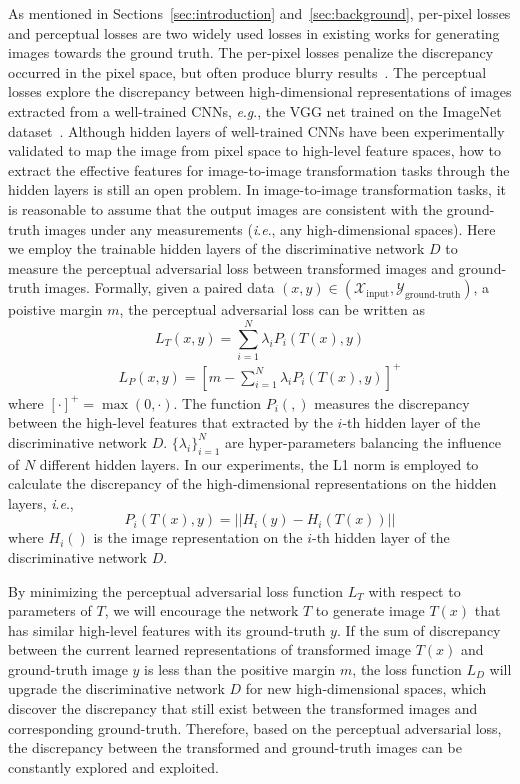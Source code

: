 \documentclass{article}
\newcommand{\ie}{\textit{i}.\textit{e}.}
\newcommand{\eg}{\textit{e}.\textit{g}.}
\begin{document}
As mentioned in Sections~\ref{sec:introduction} and~\ref{sec:background}, per-pixel losses and perceptual losses are two widely used losses in existing works for generating images towards the ground truth. The per-pixel losses penalize the discrepancy occurred in the pixel space, but often produce blurry results~\cite{pathak2016context, zhang2016colorful}. The perceptual losses explore the discrepancy between high-dimensional representations of images extracted from a well-trained CNNs, \eg, the VGG net trained on the ImageNet dataset~\cite{simonyan2014very}. Although hidden layers of well-trained CNNs have been experimentally validated to map the image from pixel space to high-level feature spaces, how to extract the effective features for image-to-image transformation tasks through the hidden layers is still an open problem. 
In image-to-image transformation tasks, it is reasonable to assume that the output images are consistent with the ground-truth images under any measurements (\ie, any high-dimensional spaces). Here we employ the trainable hidden layers of the discriminative network $D$ to measure the perceptual adversarial loss between transformed images and ground-truth images. Formally, given a paired data $(x,y) \in (\mathcal{X}_\text{input}, \mathcal{Y}_\text{ground-truth})$, a poistive margin $m$, the perceptual adversarial loss can be written as
\begin{equation}
L_T(x,y) = \sum_{i=1}^N \lambda_i P_i(T(x),y)
\end{equation}
\begin{equation}
\begin{aligned} 
L_P(x,y) = [m - \sum_{i=1}^N \lambda_i P_i(T(x),y)]^+
\end{aligned} 
\end{equation} 
where $[\cdot]^+=\max(0,\cdot)$. The function $P_i(,)$ measures the discrepancy between the high-level features that extracted by the $i$-th hidden layer of the discriminative network $D$. $\{\lambda_i\}_{i=1}^N$ are hyper-parameters balancing the influence of $N$ different hidden layers. In our experiments, the L1 norm is employed to calculate the discrepancy of the high-dimensional representations on the hidden layers, \ie, 
\begin{equation}
P_i(T(x),y) = ||H_i(y) - H_i(T(x)) ||
\end{equation} 
where $H_i()$ is the image representation on the $i$-th hidden layer of the discriminative network $D$.

By minimizing the perceptual adversarial loss function $L_T$ with respect to parameters of $T$, we will encourage the network $T$ to generate image $T(x)$ that has similar high-level features with its ground-truth $y$. If the sum of discrepancy between the current learned representations of transformed image $T(x)$ and ground-truth image $y$ is less than the positive margin $m$, the loss function $L_D$ will upgrade the discriminative network $D$ for new high-dimensional spaces, which discover the discrepancy that still exist between the transformed images and corresponding ground-truth. Therefore, based on the perceptual adversarial loss, the discrepancy between the transformed and ground-truth images can be constantly explored and exploited.
\end{document}

